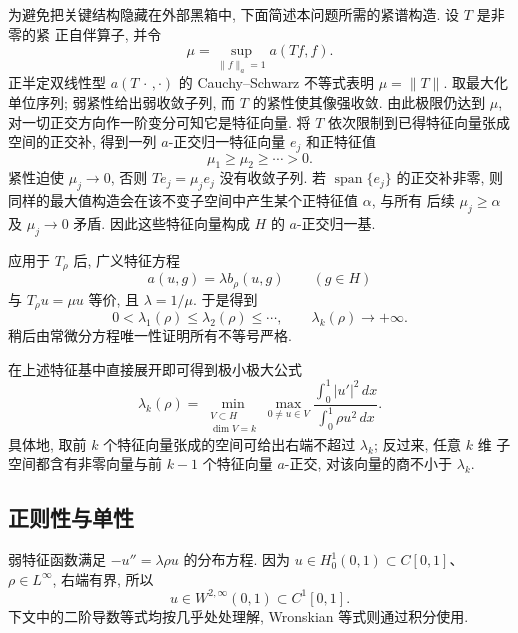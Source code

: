 \documentclass[UTF8]{ctexart}
\begin{document}
为避免把关键结构隐藏在外部黑箱中, 下面简述本问题所需的紧谱构造. 设 $T$ 是非零的紧
正自伴算子, 并令
\begin{equation*}
	\mu=\sup_{\|f\|_a=1}a(Tf,f).
\end{equation*}
正半定双线性型 $a(T\,\cdot\,,\cdot)$ 的 Cauchy--Schwarz 不等式表明 $\mu=\|T\|$.
取最大化单位序列; 弱紧性给出弱收敛子列, 而 $T$ 的紧性使其像强收敛. 由此极限仍达到
$\mu$, 对一切正交方向作一阶变分可知它是特征向量. 将 $T$ 依次限制到已得特征向量张成
空间的正交补, 得到一列 $a$-正交归一特征向量 $e_j$ 和正特征值
\begin{equation*}
	\mu_1\ge\mu_2\ge\cdots>0.
\end{equation*}
紧性迫使 $\mu_j\to0$, 否则 $Te_j=\mu_je_j$ 没有收敛子列. 若 $\operatorname{span}\{e_j\}$
的正交补非零, 则同样的最大值构造会在该不变子空间中产生某个正特征值 $\alpha$, 与所有
后续 $\mu_j\ge\alpha$ 及 $\mu_j\to0$ 矛盾. 因此这些特征向量构成 $H$ 的 $a$-正交归一基.

应用于 $T_\rho$ 后, 广义特征方程
\begin{equation*}
	a(u,g)=\lambda b_\rho(u,g)\qquad(g\in H)
\end{equation*}
与 $T_\rho u=\mu u$ 等价, 且 $\lambda=1/\mu$. 于是得到
\begin{equation*}
	0<\lambda_1(\rho)\le\lambda_2(\rho)\le\cdots,\qquad
	\lambda_k(\rho)\to+\infty .
\end{equation*}
稍后由常微分方程唯一性证明所有不等号严格.

在上述特征基中直接展开即可得到极小极大公式
\begin{equation}
	\lambda_k(\rho)=\min_{\substack{V\subset H\\\dim V=k}}
		\max_{0\ne u\in V}\frac{\int_0^1|u'|^2\,dx}{\int_0^1\rho u^2\,dx}.
	\label{eq:minimax}
\end{equation}
具体地, 取前 $k$ 个特征向量张成的空间可给出右端不超过 $\lambda_k$; 反过来, 任意 $k$ 维
子空间都含有非零向量与前 $k-1$ 个特征向量 $a$-正交, 对该向量的商不小于 $\lambda_k$.

\subsection{正则性与单性}

弱特征函数满足 $-u''=\lambda\rho u$ 的分布方程. 因为 $u\in H^1_0(0,1)\subset C[0,1]$、
$\rho\in L^\infty$, 右端有界, 所以
\begin{equation}
	u\in W^{2,\infty}(0,1)\subset C^1[0,1].
\end{equation}
下文中的二阶导数等式均按几乎处处理解, Wronskian 等式则通过积分使用.
\end{document}
